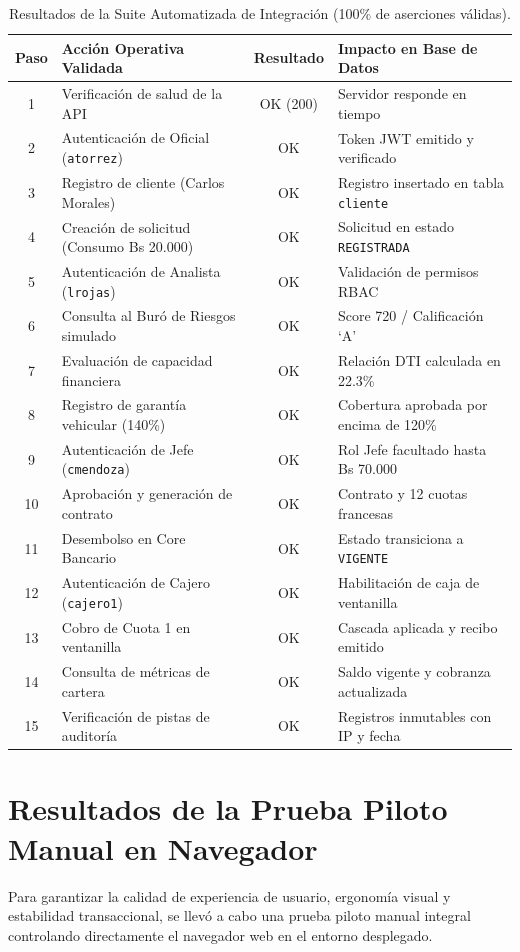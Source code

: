 \documentclass[11pt,letterpaper]{report}
\begin{document}
\begin{table}[htbp]
\centering
\small
\begin{tabularx}{\textwidth}{c l c l}
\toprule
\textbf{Paso} & \textbf{Acción Operativa Validada} & \textbf{Resultado} & \textbf{Impacto en Base de Datos} \\
\midrule
1 & Verificación de salud de la API & OK (200) & Servidor responde en tiempo \\
2 & Autenticación de Oficial (\texttt{atorrez}) & OK & Token JWT emitido y verificado \\
3 & Registro de cliente (Carlos Morales) & OK & Registro insertado en tabla \texttt{cliente} \\
4 & Creación de solicitud (Consumo Bs 20.000) & OK & Solicitud en estado \texttt{REGISTRADA} \\
5 & Autenticación de Analista (\texttt{lrojas}) & OK & Validación de permisos RBAC \\
6 & Consulta al Buró de Riesgos simulado & OK & Score 720 / Calificación `A' \\
7 & Evaluación de capacidad financiera & OK & Relación DTI calculada en 22.3\% \\
8 & Registro de garantía vehicular (140\%) & OK & Cobertura aprobada por encima de 120\% \\
9 & Autenticación de Jefe (\texttt{cmendoza}) & OK & Rol Jefe facultado hasta Bs 70.000 \\
10 & Aprobación y generación de contrato & OK & Contrato y 12 cuotas francesas \\
11 & Desembolso en Core Bancario & OK & Estado transiciona a \texttt{VIGENTE} \\
12 & Autenticación de Cajero (\texttt{cajero1}) & OK & Habilitación de caja de ventanilla \\
13 & Cobro de Cuota 1 en ventanilla & OK & Cascada aplicada y recibo emitido \\
14 & Consulta de métricas de cartera & OK & Saldo vigente y cobranza actualizada \\
15 & Verificación de pistas de auditoría & OK & Registros inmutables con IP y fecha \\
\bottomrule
\end{tabularx}
\caption{Resultados de la Suite Automatizada de Integración (100\% de aserciones válidas).}
\end{table}

\section{Resultados de la Prueba Piloto Manual en Navegador}
Para garantizar la calidad de experiencia de usuario, ergonomía visual y estabilidad transaccional, se llevó a cabo una prueba piloto manual integral controlando directamente el navegador web en el entorno desplegado.
\end{document}
